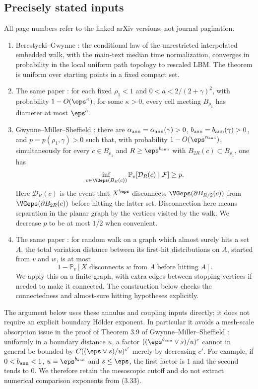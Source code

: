 \subsection{Precisely stated inputs}
All page numbers refer to the linked arXiv versions, not journal
pagination.
\begin{enumerate}[label=(\alph*)]
\item Berestycki--Gwynne \cite[Theorem 1.2, p.~10]{berestycki2020random}:
the conditional law of the unrestricted
interpolated embedded walk, with the main-text median time
normalization, converges in probability in the local uniform path
topology to rescaled LBM. The theorem is uniform over starting
points in a fixed compact set.
\item The same paper \cite[Lemma 2.4, p.~17]{berestycki2020random}: for each fixed
$\rho_1<1$ and $0<a<2/(2+\gamma)^2$, with probability
$1-O(\eps^\kappa)$, for some $\kappa>0$, every cell meeting
$B_{\rho_1}$ has diameter at most $\eps^a$.
\item Gwynne--Miller--Sheffield \cite[Lemma 3.11, (3.35), p.~31]{gms-harmonic}:
there are
$\alpha_{\rm ann}=\alpha_{\rm ann}(\gamma)>0$,
$b_{\rm ann}=b_{\rm ann}(\gamma)>0$, and
$p=p(\rho_1,\gamma)>0$ such that, with probability
$1-O(\eps^{\alpha_{\rm ann}})$, simultaneously for every
$c\in B_{\rho_1}$ and
$R\ge\eps^{b_{\rm ann}}$ with $B_{2R}(c)\subset B_{\rho_1}$,
one has
\[
 \inf_{v\in\VGeps(B_R(c))}
 \mathbb{P}_v[\mathcal D_R(c)\mid\mathcal F]\ge p.
\]
Here $\mathcal D_R(c)$ is the event that $X^\eps$ disconnects
$\VGeps(\partial B_{R/2}(c))$ from $\VGeps(\partial B_{2R}(c))$
before hitting the latter set.
Disconnection here means separation in the planar graph by
the vertices visited by the walk. We decrease $p$ to be at
most $1/2$ when convenient.
\item The same paper \cite[Lemma 3.10, (3.34), p.~31]{gms-harmonic}:
for random walk on a graph which almost surely hits a set $A$,
the total variation distance between its first-hit distributions
on $A$, started from $v$ and $w$, is at most
\[
 1-\mathbb{P}_v[X\text{ disconnects }w\text{ from }A
                      \text{ before hitting }A].
\]
We apply this on a finite graph, with extra edges between
stopping vertices if needed to make it connected. The
construction below checks the connectedness and almost-sure
hitting hypotheses explicitly.
\end{enumerate}
The argument below uses these annulus and coupling inputs directly;
it does not require an explicit boundary H\"older exponent.
In particular it avoids a mesh-scale absorption issue in
the proof of Theorem 3.9 of Gwynne--Miller--Sheffield \cite[p.~32, (3.37)]{gms-harmonic}:
uniformly in a boundary distance $u$,
a factor $((\eps^{b_{\rm ann}}\vee s)/u)^c$ cannot in general
be bounded by $C((\eps\vee s)/u)^{c'}$ merely by decreasing
$c'$. For example, if $0<b_{\rm ann}<1$, $u=\eps^{b_{\rm ann}}$
and $s\le\eps$, the first factor is $1$ and the second tends
to $0$. We therefore retain the mesoscopic cutoff and do not
extract numerical comparison exponents from (3.33).

